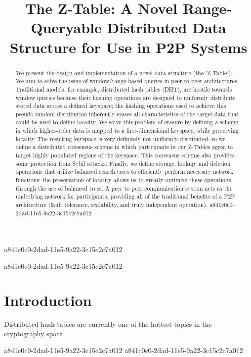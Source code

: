 \documentclass[12pt]{article}
\title{The Z-Table: A Novel Range-Queryable Distributed Data Structure for Use in P2P Systems}
\begin{document}
a841c0c0-2dad-11e5-9a22-3c15c2c7a012\maketitle

\begin{abstract}
We present the design and implementation of a novel data structure (the 'Z-Table'). We aim to solve the issue of window/range-based queries in peer to peer architectures. Traditional models, for example,  distributed hash tables (DHT), are hostile towards window queries because their hashing operations are designed to uniformly distribute stored data across a defined keyspace; the hashing operations used to achieve this pseudo-random distribution inherently erases all characteristics of the target data that could be used to define locality. We solve this problem of erasure by defining a scheme in which higher-order data is mapped to a first-dimensional keyspace, while preserving locality. The resulting keyspace is very definitely not uniformly distributed, so we define a distributed consensus scheme in which participants in our Z-Tables agree to target highly populated regions of the keyspace. This consensus scheme also provides some protection from Sybil attacks. Finally, we define storage, lookup, and deletion operations that utilize balanced search trees to efficiently perform necessary network functions; the preservation of locality allows us to greatly optimize these operations through the use of balanced trees. A peer to peer communication system acts as the underlying network for participants, providing all of the traditional benefits of a P2P architecture (fault tolerance, scalability, and truly independent operation).
a841c0c0-2dad-11e5-9a22-3c15c2c7a012\end{abstract}

a841c0c0-2dad-11e5-9a22-3c15c2c7a012
\newpage
\section{Introduction}
Distributed hash tables are currently one of the hottest topics in the cryptography space~\cite{Stoica:2001dj,Rowstron:2001ea,Ratnasamy:2001wn}

a841c0c0-2dad-11e5-9a22-3c15c2c7a012\printbibliography
a841c0c0-2dad-11e5-9a22-3c15c2c7a012
\end{document}

